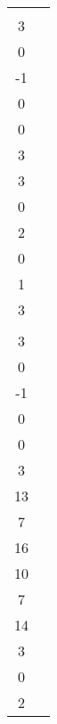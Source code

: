 \begin{applicationActivities}
\begin{activity}{15}
\begin{center}
\begin{tabular}{cc}
    \(B=\left\{
      \begin{bmatrix}2\\3\\0\\-1\end{bmatrix},
      \begin{bmatrix}2\\0\\0\\3\end{bmatrix},
      \begin{bmatrix}4\\3\\0\\2\end{bmatrix},
      \begin{bmatrix}-3\\0\\1\\3\end{bmatrix}
      \right\}
      \)  \\


      \(C=\left\{
      \begin{bmatrix}2\\3\\0\\-1\end{bmatrix},
      \begin{bmatrix}2\\0\\0\\3\end{bmatrix},
      \begin{bmatrix}3\\13\\7\\16\end{bmatrix},
      \begin{bmatrix}-1\\10\\7\\14\end{bmatrix},
      \begin{bmatrix}4\\3\\0\\2\end{bmatrix}
      \right\}
      \) &


\end{tabular}
\end{center}
\end{activity}
\end{applicationActivities}
